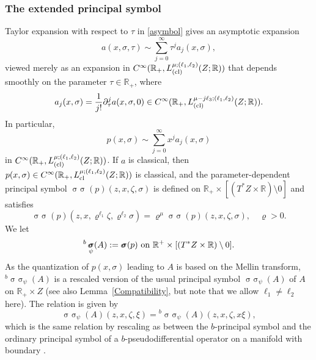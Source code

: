 \documentclass[reqno]{amsart}
\numberwithin{equation}{section}
\theoremstyle{definition}
\def\R{\mathbb R}
\DeclareMathOperator{\sym}{ \sigma\!\!\!\sigma}
\begin{document}
\subsubsection*{The extended principal symbol}

Taylor expansion with respect to $\tau$ in \eqref{asymbol} gives an asymptotic expansion
$$
a(x,\sigma,\tau) \sim \sum\limits_{j=0}^{\infty} \tau^j a_j(x,\sigma),
$$
viewed merely as an expansion in $C^{\infty}(\R_+,L_{\textup{(cl)}}^{\mu;(\ell_1,\ell_2)}(Z;\R))$ that depends smoothly on the parameter $\tau \in \R_+$, where
$$
a_j(x,\sigma) = \frac{1}{j!}\partial_{\tau}^ja(x,\sigma,0) \in C^{\infty}(\R_+,L_{\textup{(cl)}}^{\mu-j\ell_3;(\ell_1,\ell_2)}(Z;\R)).
$$
In particular,
\begin{equation}\label{pxstay}
p(x,\sigma) \sim \sum\limits_{j=0}^{\infty} x^j a_j(x,\sigma)
\end{equation}
in $C^{\infty}(\R_+,L_{\textup{(cl)}}^{\mu;(\ell_1,\ell_2)}(Z;\R))$. If $a$ is classical, then $p(x,\sigma) \in C^{\infty}(\R_+,L_{\textup{cl}}^{\mu;(\ell_1,\ell_2)}(Z;\R))$ is classical, and the parameter-dependent principal symbol $\sym(p)(z,x,\zeta,\sigma)$ is defined on $\R_+\times [(T^*Z\times\R)\setminus 0]$ and satisfies
$$
\sym(p)(z,x,\varrho^{\ell_1}\zeta,\varrho^{\ell_2}\sigma) = \varrho^{\mu}\sym(p)(z,x,\zeta,\sigma), \quad \varrho > 0.
$$
We let
\begin{equation}\label{ApsiSym}
{}^b\sym_{\psi}(A):= \sym(p) \textup{ on } \R^+\times [(T^*Z\times\R)\setminus 0].
\end{equation}
As the quantization of $p(x,\sigma)$ leading to $A$ is based on the Mellin transform, ${}^b\sym_{\psi}(A)$ is a rescaled version of the usual principal symbol $\sym_{\psi}(A)$ of $A$ on $\R_+\times Z$ (see also Lemma~\ref{Compatibility}, but note that we allow $\ell_1 \neq \ell_2$ here). The relation is given by
$$
\sym_{\psi}(A)(z,x,\zeta,\xi) = {}^b\sym_{\psi}(A)(z,x,\zeta,x\xi),
$$
which is the same relation by rescaling as between the $b$-principal symbol and the ordinary principal symbol of a $b$-pseudodifferential operator on a manifold with boundary \cite{RBM2}.
\end{document}
